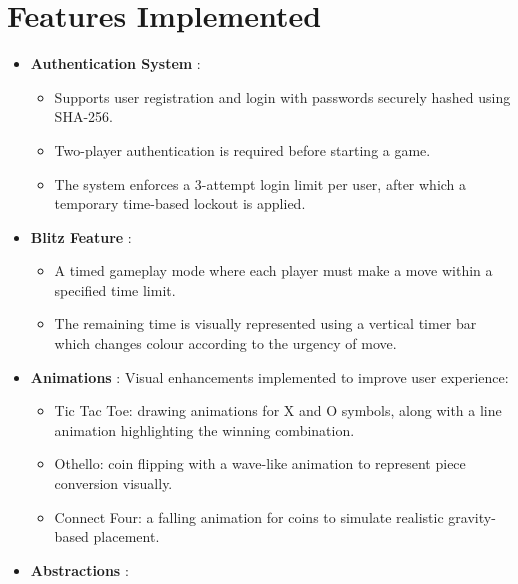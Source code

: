 \documentclass[12pt]{article}
\begin{document}
\section{Features Implemented}
\begin{itemize}
    \item \textbf{Authentication System} :
    \begin{itemize}
        \item Supports user registration and login with passwords securely hashed using SHA-256.
        \item Two-player authentication is required before starting a game.
        \item The system enforces a 3-attempt login limit per user, after which a temporary time-based lockout is applied.
    \end{itemize}
    
    \item \textbf{Blitz Feature} :
    \begin{itemize}
        \item A timed gameplay mode where each player must make a move within a specified time limit.
        \item The remaining time is visually represented using a vertical timer bar which changes colour according to the urgency of move.
    \end{itemize}


    \item \textbf{Animations} : Visual enhancements implemented to improve user experience:
    \begin{itemize}
        \item Tic Tac Toe: drawing animations for X and O symbols, along with a line animation highlighting the winning combination.
        \item Othello: coin flipping with a wave-like animation to represent piece conversion visually.
        \item Connect Four: a falling animation for coins to simulate realistic gravity-based placement.
    \end{itemize}

    \item \textbf{Abstractions} : 
    \begin{itemize}
        

\end{itemize}
\end{itemize}
\end{document}

